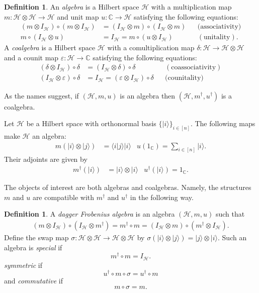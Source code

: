 \documentclass[12pt]{article}
\theoremstyle{definition}
\newtheorem{definition}[theorem]{Definition}
\newenvironment{example}
  {\pushQED{\qed}\renewcommand{\qedsymbol}{\textcircled{\tiny E}}\examplex}
  {\popQED\endexamplex}
\newcommand{\C}{\mathbb C}
\newcommand{\mc}[1]{\mathcal{#1}}
\newcommand{\<}{\langle}
\renewcommand{\>}{\rangle}
\begin{document}
\begin{definition}
    An \textit{algebra} is a Hilbert space $\mc H$ with a multiplication map $m: \mc H \otimes \mc H \to \mc H$ and unit map $u: \C \to \mc H$ satisfying the following equations:
    \begin{align*}
    (m \otimes I_{\mc H}) \circ (m \otimes I_{\mc H}) &= (I_{\mc H} \otimes m)\circ (I_{\mc H} \otimes m) &&(\text{associativity)} \\
    m \circ (I_{\mc H} \otimes u) &= I_{\mc H} = m \circ (u \otimes I_{\mc H}) &&(\text{unitality}).
    \end{align*}
    A \textit{coalgebra} is a Hilbert space $\mc H$ with a comultiplication map $\delta: \mc H \to \mc H \otimes \mc H$ and a counit map $\varepsilon: \mc H \to \C$ satisfying the following equations:
    \begin{align*}
    (\delta \otimes I_{\mc H}) \circ \delta &= (I_{\mc H} \otimes \delta) \circ \delta  &&(\text{coassociativity}) \\
    (I_{\mc H} \otimes \varepsilon) \circ \delta &= I_{\mc H} = (\varepsilon \otimes I_{\mc H}) \circ \delta &&(\text{counitality)}
    \end{align*}
\end{definition}
As the names suggest, if $(\mc H, m, u)$ is an algebra then $(\mc H, m^\dagger, u^\dagger)$ is a coalgebra. 

\begin{example} \label{ex: algebra}
    Let $\mc H$ be a Hilbert space with orthonormal basis $\{|i\>\}_{i \in [n]}$. The following maps make $\mc H$ an algebra:
    \begin{align*}
        m(|i\> \otimes |j\>) &= \<i|j\> |i\> & u(1_{\C}) = \sum_{i \in [n]} |i\>.
    \end{align*}
    Their adjoints are given by
    \begin{align*}
        m^\dagger(|i\>) &= |i\> \otimes |i\> & u^\dagger(|i\>) = 1_{\C}.
    \end{align*}
\end{example}

The objects of interest are both algebras and coalgebras. Namely, the structures $m$ and $u$ are compatible with $m^\dagger$ and $u^\dagger$ in the following way.

\begin{definition} \label{defn: daggerfrob}
    A \textit{dagger Frobenius algebra} is an algebra $(\mc H, m,u)$ such that 
    \begin{align*}
    (m \otimes I_{\mc H}) \circ (I_{\mc H} \otimes m^\dagger) = m^\dagger \circ m = (I_{\mc H} \otimes m) \circ (m^\dagger \otimes I_{\mc H}).
    \end{align*}
    Define the swap map $\sigma: \mc H \otimes \mc H \to \mc H \otimes \mc H$ by $\sigma(|i\> \otimes |j\>) = |j\> \otimes |i\>$. Such an algebra is \textit{special} if
    \[
    m^\dagger \circ m = I_{\mc H}.
    \]
    \textit{symmetric} if
    \[
    u^\dagger \circ m \circ \sigma = u^\dagger \circ m
    \]
    and \textit{commutative} if
    \[
    m \circ \sigma = m.
    \]
\end{definition}
\end{document}
